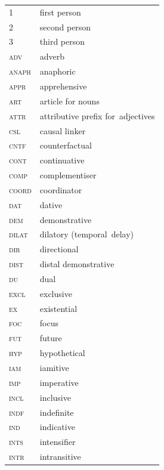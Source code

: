 \documentclass[output=paper,colorlinks,citecolor=brown,draft]{langscibook}
\begin{document}
\begin{tabularx}{.5\textwidth}{lQ}
1 & first person\\
2 & second person \\
3 & third person \\
{\scshape adv} & adverb\\
{\scshape anaph} & anaphoric\\
{\scshape appr} & apprehensive \\
{\textsc{art}} & article for nouns\\
{\scshape attr} & attributive prefix for~adjectives\\
{\scshape csl} & causal linker\\
{\scshape cntf} & counterfactual\\
{\scshape cont} & continuative\\
{\scshape comp} & complementiser\\
{\scshape coord} & coordinator\\
{\scshape dat} & dative\\
{\scshape dem} & demonstrative\\
{\scshape dilat} & dilatory (temporal~delay)\\
{\scshape dir} & directional\\
{\scshape dist} & distal demonstrative\\
{\scshape du} & dual\\
{\scshape excl} & exclusive \\
{\scshape ex} & existential\\
{\scshape foc} & focus \\
{\scshape fut} & future \\
{\scshape hyp} & hypothetical\\
{\scshape iam} & iamitive\\
{\scshape imp} & imperative\\
{\scshape incl} & inclusive\\
{\scshape indf} & indefinite\\
{\scshape ind} & indicative\\
{\scshape ints} & intensifier\\
{\scshape intr} & intransitive\\
\end{tabularx}
\end{document}
